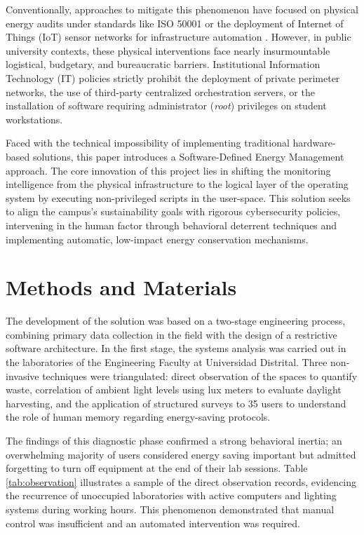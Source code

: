 \documentclass[conference]{IEEEtran}
\begin{document}
Conventionally, approaches to mitigate this phenomenon have focused on physical energy audits under standards like ISO 50001 or the deployment of Internet of Things (IoT) sensor networks for infrastructure automation \cite{b2, b5}. However, in public university contexts, these physical interventions face nearly insurmountable logistical, budgetary, and bureaucratic barriers. Institutional Information Technology (IT) policies strictly prohibit the deployment of private perimeter networks, the use of third-party centralized orchestration servers, or the installation of software requiring administrator (\textit{root}) privileges on student workstations.

Faced with the technical impossibility of implementing traditional hardware-based solutions, this paper introduces a Software-Defined Energy Management approach. The core innovation of this project lies in shifting the monitoring intelligence from the physical infrastructure to the logical layer of the operating system by executing non-privileged scripts in the user-space. This solution seeks to align the campus's sustainability goals with rigorous cybersecurity policies, intervening in the human factor through behavioral deterrent techniques and implementing automatic, low-impact energy conservation mechanisms.

\section{Methods and Materials}
The development of the solution was based on a two-stage engineering process, combining primary data collection in the field with the design of a restrictive software architecture. In the first stage, the systems analysis was carried out in the laboratories of the Engineering Faculty at Universidad Distrital. Three non-invasive techniques were triangulated: direct observation of the spaces to quantify waste, correlation of ambient light levels using lux meters to evaluate daylight harvesting, and the application of structured surveys to 35 users to understand the role of human memory regarding energy-saving protocols.

The findings of this diagnostic phase confirmed a strong behavioral inertia; an overwhelming majority of users considered energy saving important but admitted forgetting to turn off equipment at the end of their lab sessions. Table \ref{tab:observation} illustrates a sample of the direct observation records, evidencing the recurrence of unoccupied laboratories with active computers and lighting systems during working hours. This phenomenon demonstrated that manual control was insufficient and an automated intervention was required.
\end{document}
